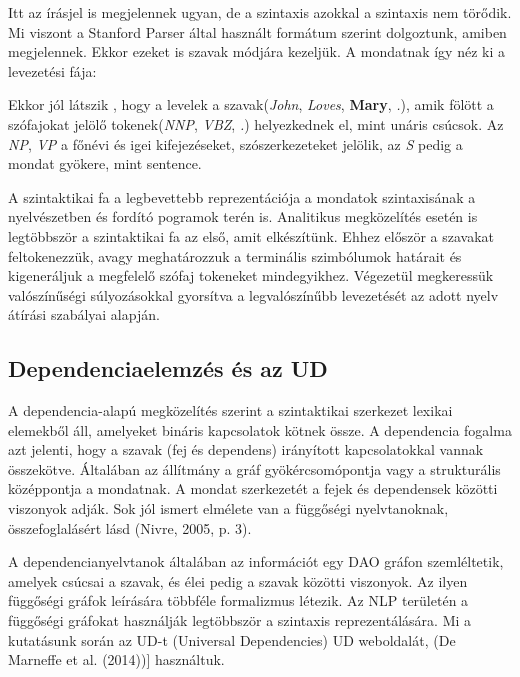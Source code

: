 Itt az írásjel is megjelennek ugyan, de a szintaxis azokkal a szintaxis nem törődik.
Mi viszont a Stanford Parser által használt formátum szerint dolgoztunk, amiben megjelennek.
Ekkor ezeket is szavak módjára kezeljük.
A mondatnak így néz ki a levezetési fája:

Ekkor jól látszik , hogy a levelek a szavak(\textit{John}, \textit{Loves}, \textbf{Mary}, \textit{.}), amik fölött a szófajokat jelölő tokenek(\textit{NNP}, \textit{VBZ}, \textit{.}) helyezkednek el, mint unáris csúcsok.
Az \textit{NP}, \textit{VP} a főnévi és igei kifejezéseket, szószerkezeteket jelölik, az \textit{S} pedig a mondat gyökere, mint sentence.



A szintaktikai fa a legbevettebb reprezentációja a mondatok szintaxisának a nyelvészetben és fordító pogramok terén is. 
Analitikus megközelítés esetén is legtöbbször a szintaktikai fa az első, amit elkészítünk. 
Ehhez először a szavakat feltokenezzük, avagy meghatározzuk a terminális szimbólumok határait és kigeneráljuk a megfelelő szófaj tokeneket mindegyikhez. 
Végezetül megkeressük valószínűségi súlyozásokkal gyorsítva a legvalószínűbb levezetését az adott nyelv átírási szabályai alapján.


\subsection{Dependenciaelemzés és az UD}
A dependencia-alapú megközelítés szerint a szintaktikai szerkezet lexikai elemekből áll, amelyeket bináris kapcsolatok kötnek össze. A dependencia fogalma azt jelenti, hogy a szavak (fej és dependens) irányított kapcsolatokkal vannak összekötve.  Általában az állítmány a gráf gyökércsomópontja vagy a strukturális középpontja a mondatnak. A mondat szerkezetét a fejek és dependensek közötti viszonyok adják. Sok jól ismert elmélete van a függőségi nyelvtanoknak, összefoglalásért lásd (Nivre, 2005, p.  3).

A dependencianyelvtanok általában az információt egy DAO gráfon szemléltetik, amelyek csúcsai a szavak, és élei pedig a szavak közötti viszonyok. Az ilyen függőségi gráfok leírására többféle formalizmus létezik. Az NLP területén a függőségi gráfokat használják legtöbbször a szintaxis reprezentálására. Mi a kutatásunk során az UD-t (Universal Dependencies) UD weboldalát, (De Marneffe et al. (2014))] használtuk.

